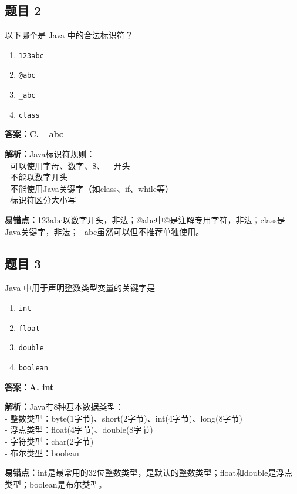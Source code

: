 \documentclass[12pt,a4paper]{ctexart}
\begin{document}
\subsection*{题目 2}
以下哪个是 Java 中的合法标识符？
\begin{enumerate}[label=\Alph*.]
	\item \texttt{123abc}
	\item \texttt{@abc}
	\item \texttt{\_abc}
	\item \texttt{class}
\end{enumerate}

\begin{answerbox}
	\textbf{答案：C. \_abc}

	\textbf{解析：}Java标识符规则：\\
	- 可以使用字母、数字、\$、\_ 开头\\
	- 不能以数字开头\\
	- 不能使用Java关键字（如class、if、while等）\\
	- 标识符区分大小写

	\textbf{易错点：}123abc以数字开头，非法；@abc中@是注解专用字符，非法；class是Java关键字，非法；\_abc虽然可以但不推荐单独使用。
\end{answerbox}

\subsection*{题目 3}
Java 中用于声明整数类型变量的关键字是
\begin{enumerate}[label=\Alph*.]
	\item \texttt{int}
	\item \texttt{float}
	\item \texttt{double}
	\item \texttt{boolean}
\end{enumerate}

\begin{answerbox}
	\textbf{答案：A. int}

	\textbf{解析：}Java有8种基本数据类型：\\
	- 整数类型：byte(1字节)、short(2字节)、int(4字节)、long(8字节)\\
	- 浮点类型：float(4字节)、double(8字节)\\
	- 字符类型：char(2字节)\\
	- 布尔类型：boolean

	\textbf{易错点：}int是最常用的32位整数类型，是默认的整数类型；float和double是浮点类型；boolean是布尔类型。
\end{answerbox}
\end{document}
